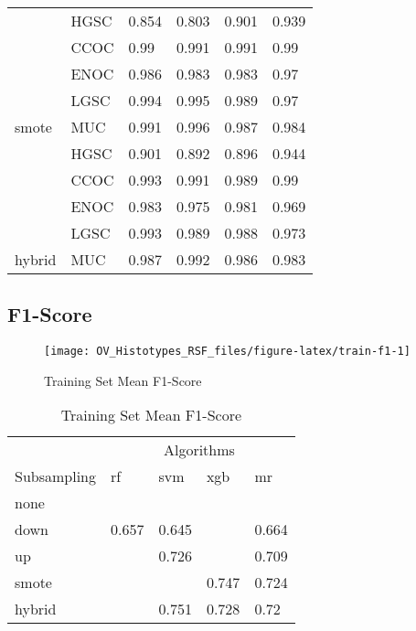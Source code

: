 \documentclass[
]{report}
\begin{document}
\begin{table}
\begin{tabular}[t]{l|l|l|l|l|l}
\cline{1-6}
 & HGSC & 0.854 & 0.803 & 0.901 & 0.939\\
\cline{2-6}
 & CCOC & 0.99 & 0.991 & 0.991 & 0.99\\
\cline{2-6}
 & ENOC & 0.986 & 0.983 & 0.983 & 0.97\\
\cline{2-6}
 & LGSC & 0.994 & 0.995 & 0.989 & 0.97\\
\cline{2-6}
\multirow{-5}{*}{\raggedright\arraybackslash smote} & MUC & 0.991 & 0.996 & 0.987 & 0.984\\
\cline{1-6}
 & HGSC & 0.901 & 0.892 & 0.896 & 0.944\\
\cline{2-6}
 & CCOC & 0.993 & 0.991 & 0.989 & 0.99\\
\cline{2-6}
 & ENOC & 0.983 & 0.975 & 0.981 & 0.969\\
\cline{2-6}
 & LGSC & 0.993 & 0.989 & 0.988 & 0.973\\
\cline{2-6}
\multirow{-5}{*}{\raggedright\arraybackslash hybrid} & MUC & 0.987 & 0.992 & 0.986 & 0.983\\
\hline
\end{tabular}
\end{table}

\subsection{F1-Score}\label{f1-score-1}

\begin{figure}[H]

{\centering \texttt{[image: OV\_Histotypes\_RSF\_files/figure-latex/train-f1-1]} 

}

\caption{Training Set Mean F1-Score}\label{fig:train-f1}
\end{figure}

\begin{table}

\caption{\label{tab:train-f1-table}Training Set Mean F1-Score}
\centering
\begin{tabular}[t]{l|l|l|l|l}
\hline
\multicolumn{1}{c|}{ } & \multicolumn{4}{c}{Algorithms} \\
\cline{2-5}
Subsampling & rf & svm & xgb & mr\\
\hline
none & \cellcolor[HTML]{FF0000}{0.787} & \cellcolor[HTML]{FFD700}{0.801} & \cellcolor[HTML]{FF0000}{0.897} & \cellcolor[HTML]{FF0000}{0.822}\\
\hline
down & 0.657 & 0.645 & \cellcolor[HTML]{FF0000}{0.231} & 0.664\\
\hline
up & \cellcolor[HTML]{FFD700}{0.755} & 0.726 & \cellcolor[HTML]{FFD700}{0.776} & 0.709\\
\hline
smote & \cellcolor[HTML]{FFD700}{0.748} & \cellcolor[HTML]{FFD700}{0.75} & 0.747 & 0.724\\
\hline
hybrid & \cellcolor[HTML]{90ee90}{0.77} & 0.751 & 0.728 & 0.72\\
\hline
\end{tabular}
\end{table}
\end{document}

